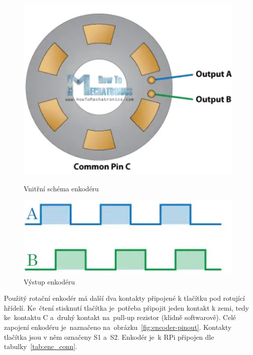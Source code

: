 \begin{figure}[htb]
  \centering
  \begin{minipage}{0.45\textwidth}
    \centering
    \includegraphics[width=1\textwidth]{img/encoder-working.jpg}
    \caption{\label{fig:encoder-working} Vnitřní schéma enkodéru~\cite{how-encoders-work}}
  \end{minipage}\hfill
  \begin{minipage}{0.45\textwidth}
    \centering
    \includegraphics[width=1\textwidth]{img/encoder-graph.jpg}
    \caption{\label{fig:encoder-graph} Výstup enkodéru~\cite{how-encoders-work}}
  \end{minipage}
\end{figure}

Použitý rotační enkodér má další dva kontakty připojené k tlačítku pod rotující hřídelí. Ke~čtení stisknutí tlačítka je~potřeba připojit jeden kontakt k zemi, tedy ke~kontaktu C a~druhý kontakt na~pull-up rezistor (klidně softwarově). Celé zapojení enkodéru je~naznačeno na~obrázku~\ref{fig:encoder-pinout}. Kontakty tlačítka jsou v něm označeny S1 a~S2. Enkodér je~k RPi připojen dle tabulky~\ref{tab:enc_conn}.

